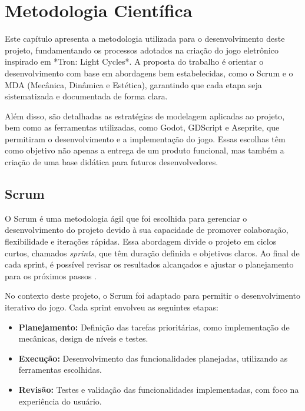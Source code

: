 \chapter[Metodologia Científica]{Metodologia Científica}

Este capítulo apresenta a metodologia utilizada para o desenvolvimento deste projeto, fundamentando os processos adotados na criação do jogo eletrônico inspirado em *Tron: Light Cycles*. A proposta do trabalho é orientar o desenvolvimento com base em abordagens bem estabelecidas, como o Scrum e o MDA (Mecânica, Dinâmica e Estética), garantindo que cada etapa seja sistematizada e documentada de forma clara.

Além disso, são detalhadas as estratégias de modelagem aplicadas ao projeto, bem como as ferramentas utilizadas, como Godot, GDScript e Aseprite, que permitiram o desenvolvimento e a implementação do jogo. Essas escolhas têm como objetivo não apenas a entrega de um produto funcional, mas também a criação de uma base didática para futuros desenvolvedores.

\section{Scrum}

O Scrum é uma metodologia ágil que foi escolhida para gerenciar o desenvolvimento do projeto devido à sua capacidade de promover colaboração, flexibilidade e iterações rápidas. Essa abordagem divide o projeto em ciclos curtos, chamados \textit{sprints}, que têm duração definida e objetivos claros. Ao final de cada sprint, é possível revisar os resultados alcançados e ajustar o planejamento para os próximos passos \cite{schwaber2013}.

No contexto deste projeto, o Scrum foi adaptado para permitir o desenvolvimento iterativo do jogo. Cada sprint envolveu as seguintes etapas:

\begin{itemize}
  \item \textbf{Planejamento:} Definição das tarefas prioritárias, como implementação de mecânicas, design de níveis e testes.
  \item \textbf{Execução:} Desenvolvimento das funcionalidades planejadas, utilizando as ferramentas escolhidas.
  \item \textbf{Revisão:} Testes e validação das funcionalidades implementadas, com foco na experiência do usuário.
\end{itemize}

